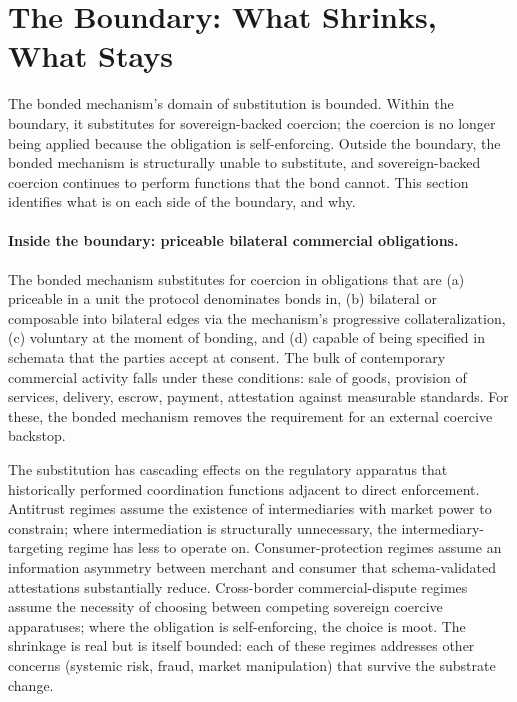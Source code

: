 \documentclass[11pt,a4paper]{article}
\theoremstyle{remark}
\begin{document}
\section{The Boundary: What Shrinks, What Stays}
\label{sec:boundary}

The bonded mechanism's domain of substitution is bounded. Within
the boundary, it substitutes for sovereign-backed coercion; the
coercion is no longer being applied because the obligation is
self-enforcing. Outside the boundary, the bonded mechanism is
structurally unable to substitute, and sovereign-backed coercion
continues to perform functions that the bond cannot. This
section identifies what is on each side of the boundary, and why.

\paragraph{Inside the boundary: priceable bilateral commercial obligations.}
The bonded mechanism substitutes for coercion in obligations that
are (a) priceable in a unit the protocol denominates bonds in,
(b) bilateral or composable into bilateral edges via the
mechanism's progressive collateralization, (c) voluntary at the
moment of bonding, and (d) capable of being specified in
schemata that the parties accept at consent. The bulk of
contemporary commercial activity falls under these conditions:
sale of goods, provision of services, delivery, escrow, payment,
attestation against measurable standards. For these, the bonded
mechanism removes the requirement for an external coercive
backstop.

The substitution has cascading effects on the regulatory
apparatus that historically performed coordination functions
adjacent to direct enforcement. Antitrust regimes assume the
existence of intermediaries with market power to constrain;
where intermediation is structurally unnecessary, the
intermediary-targeting regime has less to operate on.
Consumer-protection regimes assume an information asymmetry
between merchant and consumer that schema-validated attestations
substantially reduce. Cross-border commercial-dispute regimes
assume the necessity of choosing between competing sovereign
coercive apparatuses; where the obligation is self-enforcing,
the choice is moot. The shrinkage is real but is itself
bounded: each of these regimes addresses other concerns
(systemic risk, fraud, market manipulation) that survive the
substrate change.
\end{document}
